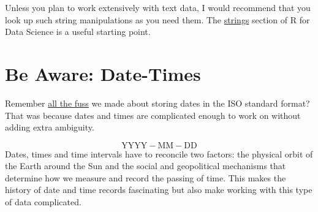\documentclass[
  letterpaper,
  DIV=11,
  numbers=noendperiod]{scrreprt}
\newenvironment{Shaded}{\begin{snugshade}}{\end{snugshade}}
\newcommand{\AttributeTok}[1]{\textcolor[rgb]{0.40,0.45,0.13}{#1}}
\newcommand{\CommentTok}[1]{\textcolor[rgb]{0.37,0.37,0.37}{#1}}
\newcommand{\ControlFlowTok}[1]{\textcolor[rgb]{0.00,0.23,0.31}{#1}}
\newcommand{\DecValTok}[1]{\textcolor[rgb]{0.68,0.00,0.00}{#1}}
\newcommand{\FunctionTok}[1]{\textcolor[rgb]{0.28,0.35,0.67}{#1}}
\newcommand{\NormalTok}[1]{\textcolor[rgb]{0.00,0.23,0.31}{#1}}
\newcommand{\OtherTok}[1]{\textcolor[rgb]{0.00,0.23,0.31}{#1}}
\newcommand{\SpecialCharTok}[1]{\textcolor[rgb]{0.37,0.37,0.37}{#1}}
\newcommand{\StringTok}[1]{\textcolor[rgb]{0.13,0.47,0.30}{#1}}
\begin{document}
\begin{Shaded}
\end{Shaded}

Unless you plan to work extensively with text data, I would recommend
that you look up such string manipulations as you need them. The
\href{https://r4ds.had.co.nz/strings.html\#strings}{strings} section of
R for Data Science is a useful starting point.

\section{Be Aware: Date-Times}\label{be-aware-date-times}

Remember \hyperref[naming-things-date-order]{all the fuss} we made about
storing dates in the ISO standard format? That was because dates and
times are complicated enough to work on without adding extra ambiguity.

\[ \text{YYYY} - \text{MM} - \text{DD}\] Dates, times and time intervals
have to reconcile two factors: the physical orbit of the Earth around
the Sun and the social and geopolitical mechanisms that determine how we
measure and record the passing of time. This makes the history of date
and time records fascinating but also make working with this type of
data complicated.
\end{document}

